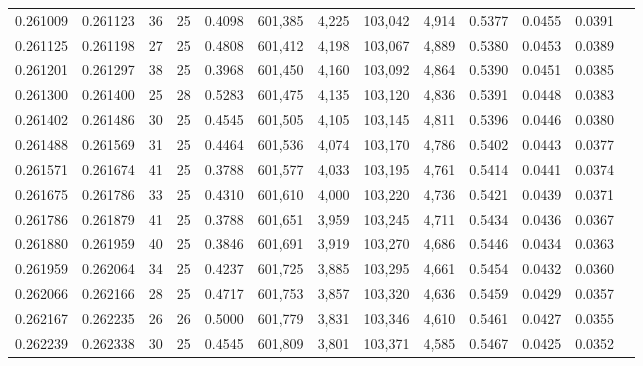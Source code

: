 \begin{tabular}{rrrrrrrrrrrrr}
0.261009 & 0.261123 &    36 &  25 &                                     0.4098 & 601,385 &   4,225 & 103,042 &   4,914 & 0.5377 & 0.0455 & 0.0391 \\
0.261125 & 0.261198 &    27 &  25 &                                     0.4808 & 601,412 &   4,198 & 103,067 &   4,889 & 0.5380 & 0.0453 & 0.0389 \\
0.261201 & 0.261297 &    38 &  25 &                                     0.3968 & 601,450 &   4,160 & 103,092 &   4,864 & 0.5390 & 0.0451 & 0.0385 \\
0.261300 & 0.261400 &    25 &  28 &                                     0.5283 & 601,475 &   4,135 & 103,120 &   4,836 & 0.5391 & 0.0448 & 0.0383 \\
0.261402 & 0.261486 &    30 &  25 &                                     0.4545 & 601,505 &   4,105 & 103,145 &   4,811 & 0.5396 & 0.0446 & 0.0380 \\
0.261488 & 0.261569 &    31 &  25 &                                     0.4464 & 601,536 &   4,074 & 103,170 &   4,786 & 0.5402 & 0.0443 & 0.0377 \\
0.261571 & 0.261674 &    41 &  25 &                                     0.3788 & 601,577 &   4,033 & 103,195 &   4,761 & 0.5414 & 0.0441 & 0.0374 \\
0.261675 & 0.261786 &    33 &  25 &                                     0.4310 & 601,610 &   4,000 & 103,220 &   4,736 & 0.5421 & 0.0439 & 0.0371 \\
0.261786 & 0.261879 &    41 &  25 &                                     0.3788 & 601,651 &   3,959 & 103,245 &   4,711 & 0.5434 & 0.0436 & 0.0367 \\
0.261880 & 0.261959 &    40 &  25 &                                     0.3846 & 601,691 &   3,919 & 103,270 &   4,686 & 0.5446 & 0.0434 & 0.0363 \\
0.261959 & 0.262064 &    34 &  25 &                                     0.4237 & 601,725 &   3,885 & 103,295 &   4,661 & 0.5454 & 0.0432 & 0.0360 \\
0.262066 & 0.262166 &    28 &  25 &                                     0.4717 & 601,753 &   3,857 & 103,320 &   4,636 & 0.5459 & 0.0429 & 0.0357 \\
0.262167 & 0.262235 &    26 &  26 &                                     0.5000 & 601,779 &   3,831 & 103,346 &   4,610 & 0.5461 & 0.0427 & 0.0355 \\
0.262239 & 0.262338 &    30 &  25 &                                     0.4545 & 601,809 &   3,801 & 103,371 &   4,585 & 0.5467 & 0.0425 & 0.0352 \\

\end{tabular}
